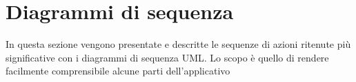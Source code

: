 \documentclass[../DefinizioneDiProdotto.tex]{subfiles}
\begin{document}
\section{Diagrammi di sequenza}

	In questa sezione vengono presentate e descritte le sequenze di azioni ritenute più significative con i diagrammi di sequenza UML. Lo scopo è quello di rendere facilmente comprensibile alcune parti dell'applicativo
\end{document}
